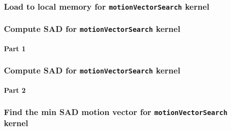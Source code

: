 \begin{frame}
  \frametitle{Load to local memory for \lstinline{motionVectorSearch}
    kernel}
  \begin{exampleblock}{}
    
    {\color{red} }
  \end{exampleblock}
\end{frame}

\begin{frame}
  \frametitle{Compute SAD for \lstinline{motionVectorSearch} kernel}
  \framesubtitle{Part 1}
  \begin{exampleblock}{}
    
    \qquad {}
    
  \end{exampleblock}
\end{frame}

\begin{frame}
  \frametitle{Compute SAD for \lstinline{motionVectorSearch} kernel}
  \framesubtitle{Part 2}
  \begin{exampleblock}{}
    
  \end{exampleblock}
\end{frame}

\begin{frame}
  \frametitle{Find the min SAD motion vector for
    \lstinline{motionVectorSearch} kernel}
  \begin{exampleblock}{}
    
  \end{exampleblock}
\end{frame}


